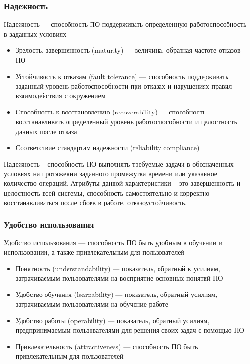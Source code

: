 \documentclass{../industrial-development}
\begin{document}
	\begin{frame} \frametitle {Надежность}
		\begin{block}{}
			\alert{Надежность} ---  способность  ПО  поддерживать  определенную  работоспособность в заданных условиях 
		\end{block}
		\begin{itemize}
			\item Зрелость, завершенность (maturity) --- величина, обратная частоте отказов ПО
			\item Устойчивость к отказам (fault tolerance) --- способность поддерживать заданный уровень работоспособности при отказах и нарушениях правил взаимодействия с окружением
			\item Способность к восстановлению (recoverability) --- способность восстанавливать определенный уровень работоспособности и целостность данных после отказа
			\item Соответствие стандартам надежности (reliability compliance)
		\end{itemize}
	\end{frame}
	\lecturenotes Надежность – способность ПО выполнять требуемые задачи в обозначенных условиях на протяжении заданного промежутка времени или указанное количество операций. Атрибуты данной характеристики – это завершенность и целостность всей системы, способность самостоятельно и корректно восстанавливаться после сбоев в работе, отказоустойчивость.
	
	\begin{frame} \frametitle {Удобство использования}
		\begin{block}{}
			\alert{Удобство использования} --- способность ПО быть удобным в обучении и использовании, а также привлекательным для пользователей 
		\end{block}
		\begin{itemize}
			\item Понятность (understandability) --- показатель, обратный к усилиям, затрачиваемым пользователями на восприятие основных понятий ПО
			\item Удобство обучения (learnability) --- показатель, обратный усилиям, затрачиваемым пользователями на обучение работе
			\item Удобство работы (operability) --- показатель, обратный усилиям, предпринимаемым пользователями для решения своих задач с помощью ПО
			\item Привлекательность (attractiveness) --- способность ПО быть привлекательным для пользователей
		\end{itemize}
	\end{frame}
	
\end{document}
